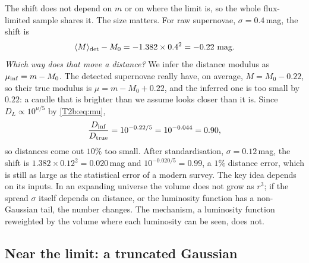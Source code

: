 The shift does not depend on $m$ or on where the limit is, so the whole flux-limited sample shares it. The size matters. For raw supernovae, $\sigma=0.4$\,mag, the shift is
\[
  \langle M\rangle_{\rm det}-M_0=-1.382\times0.4^2=-0.22\ \text{mag}.
\]
\emph{Which way does that move a distance?} We infer the distance modulus as $\mu_{\rm inf}=m-M_0$. The detected supernovae really have, on average, $M=M_0-0.22$, so their true modulus is $\mu=m-M_0+0.22$, and the inferred one is too small by $0.22$: a candle that is brighter than we assume looks closer than it is. Since $D_L\propto10^{\mu/5}$ by \eqref{T2b:eq:mu},
\[
  \frac{D_{\rm inf}}{D_{\rm true}}=10^{-0.22/5}=10^{-0.044}=0.90 ,
\]
so distances come out $10\%$ too small. After standardisation, $\sigma=0.12$\,mag, the shift is $1.382\times0.12^2=0.020$\,mag and $10^{-0.020/5}=0.99$, a $1\%$ distance error, which is still as large as the statistical error of a modern survey. The key idea depends on its inputs. In an expanding universe the volume does not grow as $r^3$; if the spread $\sigma$ itself depends on distance, or the luminosity function has a non-Gaussian tail, the number changes. The mechanism, a luminosity function reweighted by the volume where each luminosity can be seen, does not.

\subsection{Near the limit: a truncated Gaussian}

